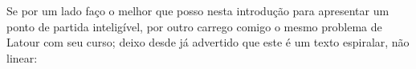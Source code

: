 Se por um lado faço o melhor que posso nesta introdução para apresentar um ponto de partida inteligível, por outro carrego comigo o mesmo problema de Latour com seu curso;
    deixo desde já advertido que este é um texto espiralar, não linear:
    




